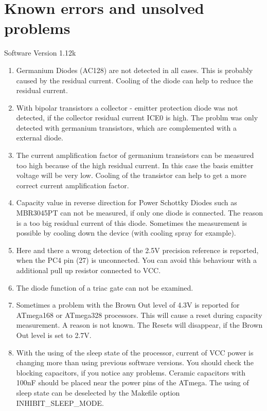 
\chapter{Known errors and unsolved problems}
{\center Software Version 1.12k}

\begin{enumerate}

\item Germanium Diodes (AC128) are not detected in all cases. This is probably caused by the residual current.
Cooling of the diode can help to reduce the residual current.

\item With bipolar transistors a collector - emitter protection diode was not detected, if the
collector residual current ICE0 is high. 
The problm was only detected with germanium transistors, which are complemented with a external diode.

\item The current amplification factor of germanium transistors can be measured too high because of
the high residual current. In this case the basis emitter voltage will be very low.
Cooling of the transistor can help to get a more correct current amplification factor.

\item Capacity value in reverse direction for Power Schottky Diodes such as MBR3045PT can not be measured,
if only one diode is connected. The reason is a too big residual current of this diode.
Sometimes the measurement is possible by cooling down the device (with  cooling spray for example).

\item Here and there  a wrong detection of the 2.5V precision reference is reported, when the PC4 pin (27) is unconnected.
You can avoid this behaviour with a additional pull up resistor connected to VCC.

\item The diode function of a triac gate can not be examined.

\item Sometimes a problem with the Brown Out level of 4.3V is reported for ATmega168 or ATmega328 processors.
This will cause a reset during capacity measurement. A reason is not known.
The Resets will disappear, if the Brown Out level is set to 2.7V.

\item With the using of the sleep state of the processor, current of VCC power is changing more than 
using previous software versions.
You should check the blocking capacitors, if you notice any problems.
Ceramic capacitors with 100nF should be placed near the power pins of the ATmega. 
The using of sleep state can be deselected by the Makefile option INHIBIT\_SLEEP\_MODE.


\end{enumerate}
